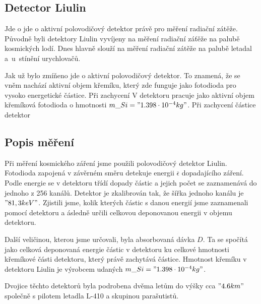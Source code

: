 \documentclass[10pt,a4paper]{article}
\begin{document}
\subsection*{Detector Liulin}
Jde o jde o aktivní polovodičový detektor právě pro měření radiační zátěže.
Původně byli detektory Liulin vyvíjeny na měření radiační záťěže na palubě
kosmických lodí. Dnes hlavně slouží na měření radiační zátěže na palubě letadal
a~u~stínění urychlovačů.\par Jak už bylo zmíňeno jde o aktivní polovodičový
detektor. To znamená, že se vněm nachází aktivní objem křemíku, který zde
funguje jako fotodioda pro vysoko energetické částice. Při zachycení %
V detektoru pracuje jako aktivní objem křemíková fotodioda o hmotnosti
$m\_{Si}="1.398\cdot 10^{-4} kg"$. Při zachycení částice detektor
\subsection*{Popis měření}
Při měření kosmického záření jsme použili polovodičový detektor Liulin. Fotodioda zapojená v závěrném směru
detekuje energii $ \overline{\epsilon} $ dopadajícího záření. Podle energie se v detektoru třídí dopady
částic a jejich počet se zaznamenává do jednoho z 256 kanálů. Detektor je zkalibrován tak, že šířka jednoho
kanálu je $"81,3 keV"$. Zjistili jsme, kolik kterých částic s danou energií jsme zaznamenali pomocí detektoru a
ásledně určili celkovou deponovanou energii v objemu detektoru.\par
Další veličinou, kterou jsme určovali, byla absorbovaná dávka $D$. Ta se spočítá jako celková deponovaná
energie částic v detektoru ku celkové hmotnosti křemíkové části detektoru, který právě zachytává částice.
Hmotnost křemíku v detektoru Liulin je výrobcem udaných $m\_{Si}="1.398\cdot 10^{-4} kg"$.\par
Dvojice těchto detektorů byla podrobena dvěma letům do výšky cca $"4.6 km"$ společně s pilotem letadla
L-410 a skupinou parašutistů.
\end{document}
